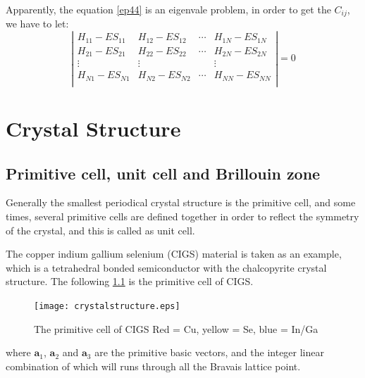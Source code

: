\documentclass[a4paper, 12pt, titlepage,oneside,drop]{kthesis}
\begin{document}
\noindent Apparently, the equation \ref{ep44} is an eigenvale problem, in order to get the $C_{ij}$, we have to let:
\begin{equation}\label{ep4}
\left|
\begin{matrix}
    H_{11} - E S_{11} & H_{12} - E S_{12} & \cdots & H_{1N} - E S_{1N} \\
   H_{21} - E S_{21} & H_{22} - E S_{22} & \cdots & H_{2N} - E S_{2N} \\
    \vdots               & \vdots               &        & \vdots               \\
  H_{N1} - E S_{N1} & H_{N2} - E S_{N2} & \cdots & H_{NN} - E S_{NN} \\
\end{matrix} \right|
=0
\end{equation}








\chapter{Crystal Structure}
\label{ch:crystalstructure}



\section{Primitive cell, unit cell and Brillouin zone}
\noindent Generally the smallest periodical crystal structure is the primitive cell, and some times, several primitive cells are defined together
in order to reflect the symmetry of the crystal, and this is called as unit cell.

\noindent The copper indium gallium selenium (CIGS) material is taken as an example, which is a tetrahedral bonded semiconductor with the
 chalcopyrite crystal structure. The following \ref{crystr} is the primitive cell of CIGS.
\begin{figure}[h]\label{crystr}
\begin{center}
\texttt{[image: crystalstructure.eps]}
\caption{The primitive cell of CIGS Red = Cu, yellow = Se, blue = In/Ga }
\end{center}

\end{figure}


\noindent where $\textbf{a}_{1}$, $\textbf{a}_{2}$ and  $\textbf{a}_{3}$ are the primitive basic vectors, and the integer linear combination of which will runs through all the Bravais
 lattice point.
\end{document}
